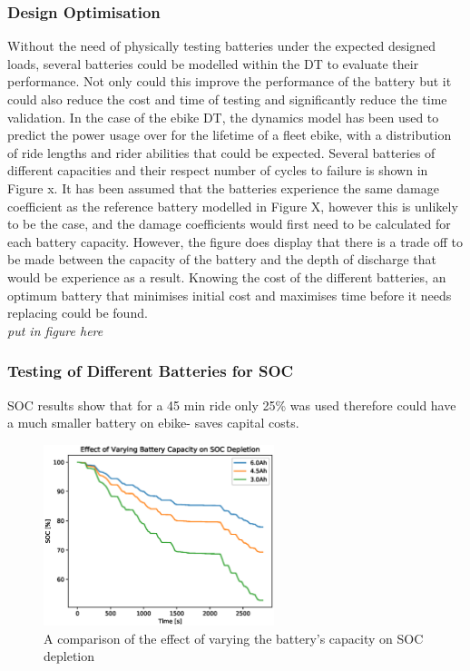 \documentclass[a4paper, 10pt]{article}
\numberwithin{equation}{section}
\begin{document}
\subsubsection{Design Optimisation}
Without the need of physically testing batteries under the expected designed loads, several batteries could be modelled within the DT to evaluate their performance. Not only could this improve the performance of the battery but it could also reduce the cost and time of testing and significantly reduce the time validation.
In the case of the ebike DT, the dynamics model has been used to predict the power usage over for the lifetime of a fleet ebike, with a distribution of ride lengths and rider abilities that could be expected. Several batteries of different capacities and their respect number of cycles to failure is shown in Figure x. It has been assumed that the batteries experience the same damage coefficient as the reference battery modelled in Figure X, however this is unlikely to be the case, and the damage coefficients would first need to be calculated for each battery capacity. However, the figure does display that there is a trade off to be made between the capacity of the battery and the depth of discharge that would be experience as a result. Knowing the cost of the different batteries, an optimum battery that minimises initial cost and maximises time before it needs replacing could be found.
\\
\textit{put in figure here}

\subsubsection{Testing of Different Batteries for SOC}

SOC results show that for a 45 min ride only 25\% was used therefore could have a much smaller battery on ebike- saves capital costs.

\begin{figure}[H]
    \centering
    \includegraphics[width=0.6\textwidth]{images/smaller_cap_SOC.eps}
    \caption{A comparison of the effect of varying the battery's capacity on SOC depletion}
    \label{fig:smaller_cap_soc}
\end{figure}
\end{document}
